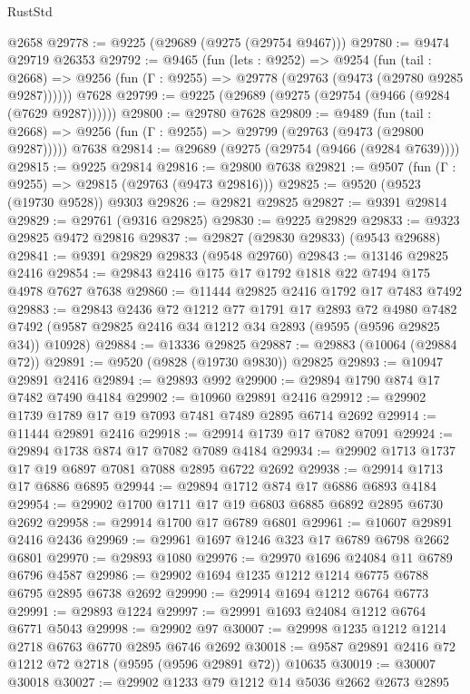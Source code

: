 \begin{lexlean}{RustStd}
\begin{coremodule}
    @2658
@29778 := @9225 (@29689 (@9275 (@29754 @9467)))
@29780 := @9474 @29719 @26353
@29792 := @9465
    (fun (lets : @9252) =>
    @9254
      (fun (tail : @2668) =>
      @9256 (fun (Γ : @9255) => @29778 (@29763 (@9473 (@29780 @9285 @9287))))))
    @7628
@29799 := @9225 (@29689 (@9275 (@29754 (@9466 (@9284 (@7629 @9287))))))
@29800 := @29780 @7628
@29809 := @9489
    (fun (tail : @2668) => @9256 (fun (Γ : @9255) => @29799 (@29763 (@9473 (@29800 @9287)))))
    @7638
@29814 := @29689 (@9275 (@29754 (@9466 (@9284 @7639))))
@29815 := @9225 @29814
@29816 := @29800 @7638
@29821 := @9507 (fun (Γ : @9255) => @29815 (@29763 (@9473 @29816)))
@29825 := @9520 (@9523 (@19730 @9528)) @9303
@29826 := @29821 @29825
@29827 := @9391 @29814
@29829 := @29761 (@9316 @29825)
@29830 := @9225 @29829
@29833 := @9323 @29825 @9472 @29816
@29837 := @29827 (@29830 @29833) (@9543 @29688)
@29841 := @9391 @29829 @29833 (@9548 @29760)
@29843 := @13146 @29825 @2416
@29854 := @29843 @2416 @175 @17 @1792 @1818 @22 @7494 @175 @4978 @7627 @7638
@29860 := @11444 @29825 @2416 @1792 @17 @7483 @7492
@29883 := @29843
    @2436
    @72
    @1212
    @77
    @1791
    @17
    @2893
    @72
    @4980
    @7482
    @7492
    (@9587 @29825 @2416 @34 @1212 @34 @2893 (@9595 (@9596 @29825 @34)) @10928)
@29884 := @13336 @29825
@29887 := @29883 (@10064 (@29884 @72))
@29891 := @9520 (@9828 (@19730 @9830)) @29825
@29893 := @10947 @29891 @2416
@29894 := @29893 @992
@29900 := @29894 @1790 @874 @17 @7482 @7490 @4184
@29902 := @10960 @29891 @2416
@29912 := @29902 @1739 @1789 @17 @19 @7093 @7481 @7489 @2895 @6714 @2692
@29914 := @11444 @29891 @2416
@29918 := @29914 @1739 @17 @7082 @7091
@29924 := @29894 @1738 @874 @17 @7082 @7089 @4184
@29934 := @29902 @1713 @1737 @17 @19 @6897 @7081 @7088 @2895 @6722 @2692
@29938 := @29914 @1713 @17 @6886 @6895
@29944 := @29894 @1712 @874 @17 @6886 @6893 @4184
@29954 := @29902 @1700 @1711 @17 @19 @6803 @6885 @6892 @2895 @6730 @2692
@29958 := @29914 @1700 @17 @6789 @6801
@29961 := @10607 @29891 @2416 @2436
@29969 := @29961 @1697 @1246 @323 @17 @6789 @6798 @2662 @6801
@29970 := @29893 @1080
@29976 := @29970 @1696 @24084 @11 @6789 @6796 @4587
@29986 := @29902 @1694 @1235 @1212 @1214 @6775 @6788 @6795 @2895 @6738 @2692
@29990 := @29914 @1694 @1212 @6764 @6773
@29991 := @29893 @1224
@29997 := @29991 @1693 @24084 @1212 @6764 @6771 @5043
@29998 := @29902 @97
@30007 := @29998 @1235 @1212 @1214 @2718 @6763 @6770 @2895 @6746 @2692
@30018 := @9587 @29891 @2416 @72 @1212 @72 @2718 (@9595 (@9596 @29891 @72)) @10635
@30019 := @30007 @30018
@30027 := @29902 @1233 @79 @1212 @14 @5036 @2662 @2673 @2895

\end{coremodule}
\end{lexlean}
